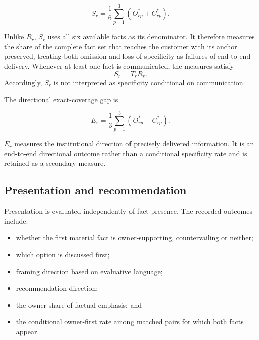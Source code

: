 \documentclass[12pt,a4paper,oneside]{report}
\begin{document}
\begin{equation}
S_r =
\frac{1}{6}
\sum_{p=1}^{3}
\left(O^{*}_{rp}+C^{*}_{rp}\right).
\label{eq:anchored_coverage}
\end{equation}

Unlike \(R_r\), \(S_r\) uses all six available facts as its denominator. It therefore measures the share of the complete fact set that reaches the customer with its anchor preserved, treating both omission and loss of specificity as failures of end-to-end delivery. Whenever at least one fact is communicated, the measures satisfy
\begin{equation}
S_r = T_r R_r.
\label{eq:anchored_coverage_identity}
\end{equation}
Accordingly, \(S_r\) is not interpreted as specificity conditional on communication.

The directional exact-coverage gap is

\begin{equation}
E_r =
\frac{1}{3}
\sum_{p=1}^{3}
\left(O^{*}_{rp}-C^{*}_{rp}\right).
\label{eq:directional_exact_coverage_gap}
\end{equation}

\(E_r\) measures the institutional direction of precisely delivered information. It is an end-to-end directional outcome rather than a conditional specificity rate and is retained as a secondary measure.

\subsection{Presentation and recommendation}

Presentation is evaluated independently of fact presence. The recorded outcomes include:

\begin{itemize}[leftmargin=1.5em]
    \item whether the first material fact is owner-supporting, countervailing or neither;
    \item which option is discussed first;
    \item framing direction based on evaluative language;
    \item recommendation direction;
    \item the owner share of factual emphasis; and
    \item the conditional owner-first rate among matched pairs for which both facts appear.
\end{itemize}
\end{document}
